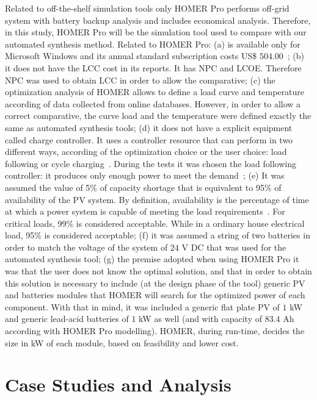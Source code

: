 \documentclass[journal]{IEEEtran}
\begin{document}
Related to off-the-shelf simulation tools only HOMER Pro performs off-grid system with battery backup analysis and includes economical analysis. Therefore, in this study, HOMER Pro will be the simulation tool used to compare with our automated synthesis method.  Related to HOMER Pro: (a) is available only for Microsoft Windows and its annual standard subscription costs US\$ $504.00$~\cite{HOMER}; (b) it does not have the LCC cost in its reports. It has NPC and LCOE. Therefore NPC was used to obtain LCC in order to allow the comparative; (c) the optimization analysis of HOMER allows to define a load curve and temperature according of data collected from online databases. However, in order to allow a correct comparative, the curve load and the temperature were defined exactly the same as automated synthesis tools; (d) it does not have a explicit equipment called charge controller. It uses a controller resource that can perform in two different ways, according of the optimization choice or the user choice: load following or cycle charging~\cite{HOMER}. During the tests it was chosen the load following controller: it produces only enough power to meet the demand~\cite{HOMER}; (e) It was assumed the value of 5\% of capacity shortage that is equivalent to 95\% of availability of the PV system. By definition, availability is the percentage of time at which a power system is capable of meeting the load requirements~\cite{Khatib2014}. For critical loads, 99\% is considered acceptable. While in a ordinary house electrical load, 95\% is considered acceptable; (f) it was assumed a string of two batteries in order to match the voltage of the system of $24$ V DC that was used for the automated synthesis tool; (g) the premise adopted when using HOMER Pro it was that the user does not know the optimal solution, and that in order to obtain this solution is necessary to include (at the design phase of the tool) generic PV and batteries modules that HOMER will search for the optimized power of each component. With that in mind, it was included a generic flat plate PV of $1$ kW and generic lead-acid batteries of $1$ kW as well (and with capacity of $83.4$ Ah according with HOMER Pro modelling). HOMER, during run-time, decides the size in kW of each module, based on feasibility and lower cost.

\section{Case Studies and Analysis}
\label{sec:Results}
\end{document}
